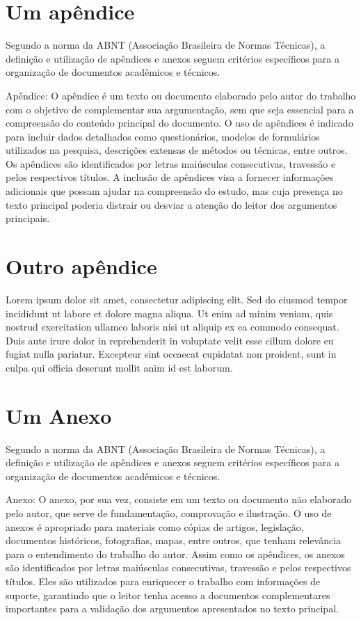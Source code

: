 \documentclass[dsc,pdfa,setavermelha]{ufrj}
\theoremstyle{plain}
\theoremstyle{definition}
\theoremstyle{remark}
\begin{document}
\chapter{Um apêndice}

Segundo a norma da ABNT (Associação Brasileira de Normas Técnicas), a definição e utilização de apêndices e anexos seguem critérios específicos para a organização de documentos acadêmicos e técnicos.

Apêndice: O apêndice é um texto ou documento elaborado pelo autor do trabalho com o objetivo de complementar sua argumentação, sem que seja essencial para a compreensão do conteúdo principal do documento. O uso de apêndices é indicado para incluir dados detalhados como questionários, modelos de formulários utilizados na pesquisa, descrições extensas de métodos ou técnicas, entre outros. Os apêndices são identificados por letras maiúsculas consecutivas, travessão e pelos respectivos títulos. A inclusão de apêndices visa a fornecer informações adicionais que possam ajudar na compreensão do estudo, mas cuja presença no texto principal poderia distrair ou desviar a atenção do leitor dos argumentos principais.

\chapter{Outro apêndice}

Lorem ipsum dolor sit amet, consectetur adipiscing elit. Sed do eiusmod tempor incididunt ut labore et dolore magna aliqua. Ut enim ad minim veniam, quis nostrud exercitation ullamco laboris nisi ut aliquip ex ea commodo consequat. Duis aute irure dolor in reprehenderit in voluptate velit esse cillum dolore eu fugiat nulla pariatur. Excepteur sint occaecat cupidatat non proident, sunt in culpa qui officia deserunt mollit anim id est laborum.

\annex

\chapter{Um Anexo}
Segundo a norma da ABNT (Associação Brasileira de Normas Técnicas), a definição e utilização de apêndices e anexos seguem critérios específicos para a organização de documentos acadêmicos e técnicos.

Anexo: O anexo, por sua vez, consiste em um texto ou documento não elaborado pelo autor, que serve de fundamentação, comprovação e ilustração. O uso de anexos é apropriado para materiais como cópias de artigos, legislação, documentos históricos, fotografias, mapas, entre outros, que tenham relevância para o entendimento do trabalho do autor. Assim como os apêndices, os anexos são identificados por letras maiúsculas consecutivas, travessão e pelos respectivos títulos. Eles são utilizados para enriquecer o trabalho com informações de suporte, garantindo que o leitor tenha acesso a documentos complementares importantes para a validação dos argumentos apresentados no texto principal.
\end{document}
